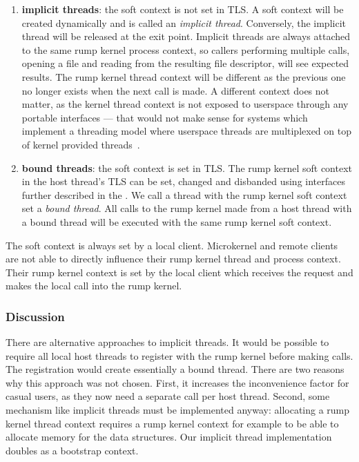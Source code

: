 \begin{enumerate}
\item \textbf{implicit threads}: the soft context is not set
in TLS.  A soft context will be created dynamically and is called
an \textit{implicit thread}.  Conversely, the implicit thread will be
released at the exit point.  Implicit threads are always attached to the
same rump kernel process context, so callers performing multiple calls,
\eg opening a file and reading from the resulting file descriptor,
will see expected results.  The rump kernel thread context will be
different as the previous one no longer exists when the next call
is made.  A different context does not matter, as the kernel thread
context is not exposed to userspace through any portable interfaces
--- that would not make sense for systems which implement a threading
model where userspace threads are multiplexed on top of kernel provided
threads~\cite{anderson:scheduler_activations}.

\item \textbf{bound threads}: the soft context is set in TLS.
The rump kernel soft context in the host thread's TLS can be set,
changed and disbanded using interfaces further described in the
.  We call a thread with the rump
kernel soft context set a \textit{bound thread}.  All calls to the rump
kernel made from a host thread with a bound thread will be executed with
the same rump kernel soft context.
\end{enumerate}

The soft context is always set by a local client.  Microkernel and
remote clients are not able to directly influence their rump kernel thread
and process context.  Their rump kernel context is set by the local client
which receives the request and makes the local call into the rump kernel.

\subsubsection*{Discussion}

There are alternative approaches to implicit threads.  It would
be possible to require all local host threads to register with the rump
kernel before making calls.  The registration would create essentially
a bound thread.  There are two reasons why this approach was not chosen.
First, it increases the inconvenience factor for casual users, as they
now need a separate call per host thread.  Second, some mechanism
like implicit threads must be implemented anyway: allocating a rump
kernel thread context requires a rump kernel context for example to be
able to allocate memory for the data structures.  Our implicit thread
implementation doubles as a bootstrap context.

